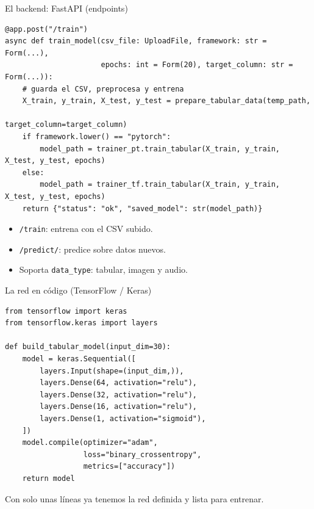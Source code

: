\documentclass[10pt,aspectratio=169]{beamer}
\begin{document}
\begin{frame}[fragile]{El backend: FastAPI (endpoints)}
  \lstset{language=Python,basicstyle=\ttfamily\tiny}
  \begin{lstlisting}
@app.post("/train")
async def train_model(csv_file: UploadFile, framework: str = Form(...),
                      epochs: int = Form(20), target_column: str = Form(...)):
    # guarda el CSV, preprocesa y entrena
    X_train, y_train, X_test, y_test = prepare_tabular_data(temp_path,
                                             target_column=target_column)
    if framework.lower() == "pytorch":
        model_path = trainer_pt.train_tabular(X_train, y_train, X_test, y_test, epochs)
    else:
        model_path = trainer_tf.train_tabular(X_train, y_train, X_test, y_test, epochs)
    return {"status": "ok", "saved_model": str(model_path)}
  \end{lstlisting}

  \pause
  \begin{itemize}
    \item \texttt{/train}: entrena con el CSV subido.
    \item \texttt{/predict/}: predice sobre datos nuevos.
    \item Soporta \texttt{data\_type}: tabular, imagen y audio.
  \end{itemize}
\end{frame}

\begin{frame}[fragile]{La red en código (TensorFlow / Keras)}
  \lstset{language=Python,basicstyle=\ttfamily\tiny}
  \begin{lstlisting}
from tensorflow import keras
from tensorflow.keras import layers

def build_tabular_model(input_dim=30):
    model = keras.Sequential([
        layers.Input(shape=(input_dim,)),
        layers.Dense(64, activation="relu"),
        layers.Dense(32, activation="relu"),
        layers.Dense(16, activation="relu"),
        layers.Dense(1, activation="sigmoid"),
    ])
    model.compile(optimizer="adam",
                  loss="binary_crossentropy",
                  metrics=["accuracy"])
    return model
  \end{lstlisting}
  \pause
  \begin{center}
    \small Con solo unas líneas ya tenemos la red definida y lista para entrenar.
  \end{center}
\end{frame}
\end{document}
